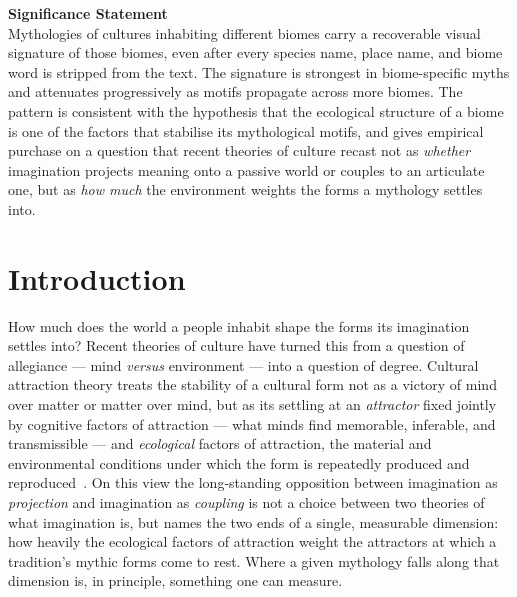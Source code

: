 \documentclass[11pt,a4paper]{article}
\begin{document}
\noindent\textbf{Significance Statement}\\[0.4em]
Mythologies of cultures inhabiting different biomes carry a recoverable
visual signature of those biomes, even after every species name, place
name, and biome word is stripped from the text. The signature is
strongest in biome-specific myths and attenuates progressively as
motifs propagate across more biomes. The pattern is consistent with
the hypothesis that the ecological structure of a biome is one of the
factors that stabilise its mythological motifs, and gives empirical
purchase on a question that recent theories of culture recast not as
\emph{whether} imagination projects meaning onto a passive world or
couples to an articulate one, but as \emph{how much} the environment
weights the forms a mythology settles into.

\vspace{1em}

\section*{Introduction}

How much does the world a people inhabit shape the forms its
imagination settles into? Recent theories of culture have turned this
from a question of allegiance --- mind \emph{versus} environment ---
into a question of degree. Cultural attraction theory treats the
stability of a cultural form not as a victory of mind over matter or
matter over mind, but as its settling at an \emph{attractor} fixed
jointly by cognitive factors of attraction --- what minds find
memorable, inferable, and transmissible --- and \emph{ecological}
factors of attraction, the material and environmental conditions under
which the form is repeatedly produced and
reproduced~\citep{sperber1996explaining,claidiere2014darwinian,morin2016traditions}.
On this view the long-standing opposition between imagination as
\emph{projection} and imagination as \emph{coupling} is not a choice
between two theories of what imagination is, but names the two ends of
a single, measurable dimension: how heavily the ecological factors of
attraction weight the attractors at which a tradition's mythic forms
come to rest. Where a given mythology falls along that dimension is, in
principle, something one can measure.
\end{document}
